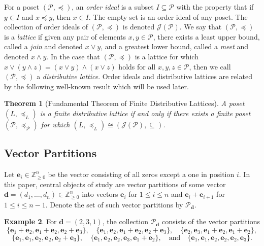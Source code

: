 \documentclass{amsart}
\def\PP{\mathcal{P}}
\def\bfd{{\mathbf{d}}}
\newtheorem{theorem}{Theorem}[section]
\theoremstyle{definition}
\newtheorem{example}[theorem]{Example}
\begin{document}
For a poset $(\mathcal{P},\preceq)$, an \emph{order ideal} is a subset $I\subseteq\mathcal{P}$ with the property that if $y\in I$ and $x\preceq y$, then $x\in I$. The empty set is an order ideal of any poset. The collection of order ideals of $(\mathcal{P},\preceq)$ is denoted $\mathcal{J}(\mathcal{P})$. We say that $(\mathcal{P},\preceq)$ is a \emph{lattice} if given any pair of elements $x,y\in\mathcal{P}$, there exists a least upper bound, called a \emph{join} and denoted $x\vee y$, and a greatest lower bound, called a \emph{meet} and denoted $x\wedge y$. In the case that $(\mathcal{P},\preceq)$ is a lattice for which $x\vee(y\wedge z)=(x\vee y)\wedge (x\vee z)$ holds for all $x,y,z\in\mathcal{P}$, then we call $(\mathcal{P},\preceq)$ a \emph{distributive lattice}. Order ideals and distributive lattices are related by the following well-known result which will be used later.

\begin{theorem}[Fundamental Theorem of Finite Distributive Lattices]\label{thm:FTFDL}
    A poset $(L,\preceq_L)$ is a finite distributive lattice if and only if there exists a finite poset $(\mathcal{P},\preceq_{\mathcal{P}})$ for which $(L,\preceq_L)\cong(\mathcal{J}(\mathcal{P}),\subseteq)$.
\end{theorem}

\subsection{Vector Partitions}
\label{subsec:partitions}

 Let $\mathbf{e}_i\in \mathbb{Z}_{\ge 0}^n$ be the vector consisting of all zeros except a one in position $i$. In this paper, central objects of study are vector partitions of some vector $\mathbf{d}=(d_1,\ldots,d_n)\in\mathbb{Z}_{\ge 0}^n$ into vectors $\mathbf{e}_i$ for $1\leq i\leq n$ and $\mathbf{e}_i+\mathbf{e}_{i+1}$ for $1\leq i\leq n-1$.
Denote the set of such vector partitions by $\PP_\bfd$.

\begin{example}\label{ex:PP}
    For $\mathbf{d}=(2,3,1)$, the collection $\mathcal{P}_\mathbf{d}$ consists of the vector partitions
    $$\{\mathbf{e}_1+\mathbf{e}_2,\mathbf{e}_1+\mathbf{e}_2,\mathbf{e}_2+\mathbf{e}_3\},\quad
    \{\mathbf{e}_1,\mathbf{e}_2,\mathbf{e}_1+\mathbf{e}_2,\mathbf{e}_2+\mathbf{e}_3\},\quad
    \{\mathbf{e}_2,\mathbf{e}_3,\mathbf{e}_1+\mathbf{e}_2,\mathbf{e}_1+\mathbf{e}_2\},$$
    $$\{\mathbf{e}_1,\mathbf{e}_1,\mathbf{e}_2,\mathbf{e}_2,\mathbf{e}_2+\mathbf{e}_3\},\quad
    \{\mathbf{e}_1,\mathbf{e}_2,\mathbf{e}_2,\mathbf{e}_3,\mathbf{e}_1+\mathbf{e}_2\},\quad\text{and}\quad
    \{\mathbf{e}_1,\mathbf{e}_1,\mathbf{e}_2,\mathbf{e}_2,\mathbf{e}_2,\mathbf{e}_3\}.$$
\end{example}
\end{document}
